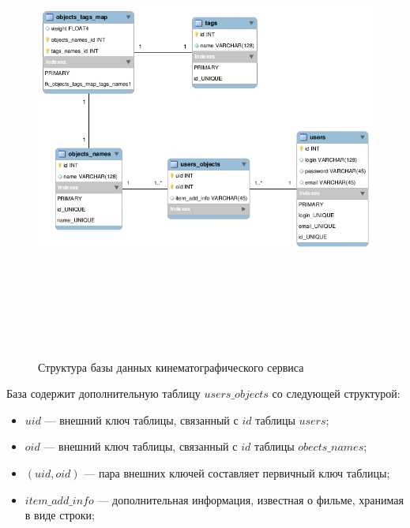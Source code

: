 \begin{figure}
	\label{pic:db-ml}
\caption{Структура базы данных кинематографического сервиса}
\begin{center}
  \includegraphics[width=7in,height=6in]{pics/db-scheme-ml.png}
\end{center}
\end{figure}

База содержит дополнительную таблицу $users\_objects$ со следующей структурой:
\begin{itemize}
\item $uid$ --- внешний ключ таблицы, связанный с $id$ таблицы $users$;
\item $oid$ --- внешний ключ таблицы, связанный с $id$ таблицы $obects\_names$;
\item $(uid, oid)$ --- пара внешних ключей составляет первичный ключ таблицы;
\item $item\_add\_info$ --- дополнительная информация, известная о фильме, хранимая в виде строки;
\end{itemize}

